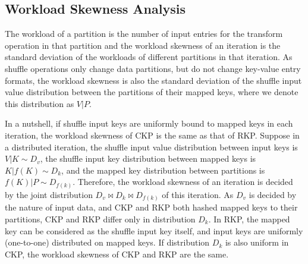 \documentclass[10pt,journal,compsoc]{IEEEtran}
\begin{document}
\subsection{Workload Skewness Analysis}\label{section:skew}
The workload of a partition is the number of input entries for the transform operation in that partition and 
the workload skewness of an iteration is the standard deviation of the workloads of different partitions in that iteration. 
As shuffle operations only change data partitions, but do not change 
key-value entry formats, the workload skewness is also the standard deviation of 
the shuffle input value distribution between the partitions of their mapped keys, 
where we denote this distribution as $V|P$. 


In a nutshell, if shuffle input keys are uniformly bound to mapped keys in each
iteration, the workload skewness of CKP is the same as that of RKP. 
Suppose in a distributed iteration, the shuffle input value distribution
between input keys is $V|K \sim D_v$, the shuffle input key distribution 
between mapped keys is $K|f(K) \sim D_k$, and the mapped key distribution 
between partitions is $f(K)|P \sim D_{f(k)}$. 
Therefore, the workload skewness of an iteration is decided by 
the joint distribution $D_v \bowtie D_k \bowtie D_{f(k)}$ of this iteration.
As $D_v$ is decided by the nature of input data, 
and CKP and RKP both hashed mapped keys to their partitions, 
CKP and RKP differ only in distribution $D_k$. 
In RKP, the mapped key can be considered as the shuffle input key itself, 
and input keys are uniformly (one-to-one) distributed on mapped keys. 
If distribution $D_k$ is also uniform in CKP, 
the workload skewness of CKP and RKP are the same. 



\end{document}
